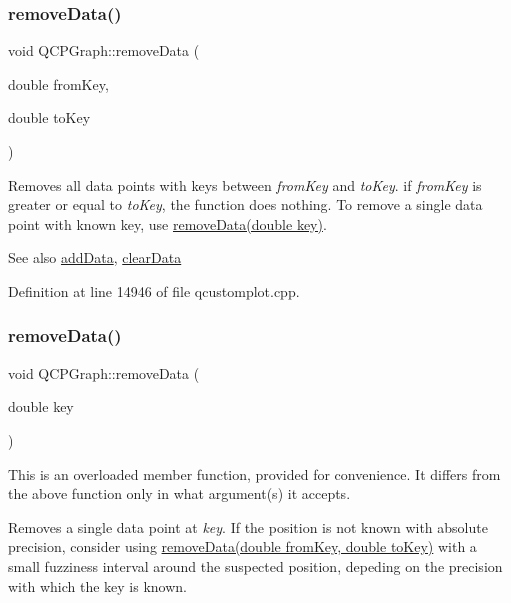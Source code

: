 \subsubsection{\texorpdfstring{remove\+Data()}{removeData()}\hspace{0.1cm}{\footnotesize\ttfamily [1/2]}}
{\footnotesize\ttfamily void Q\+C\+P\+Graph\+::remove\+Data (\begin{DoxyParamCaption}\item[{double}]{from\+Key,  }\item[{double}]{to\+Key }\end{DoxyParamCaption})}

Removes all data points with keys between {\itshape from\+Key} and {\itshape to\+Key}. if {\itshape from\+Key} is greater or equal to {\itshape to\+Key}, the function does nothing. To remove a single data point with known key, use \hyperlink{class_q_c_p_graph_a4a706020b4318f118381648ef18aca3f}{remove\+Data(double key)}.

\begin{DoxySeeAlso}{See also}
\hyperlink{class_q_c_p_graph_aa5c6181d84db72ce4dbe9dc15a34ef4f}{add\+Data}, \hyperlink{class_q_c_p_graph_ad4e94a4e44e5e76fbec81a72a977157d}{clear\+Data} 
\end{DoxySeeAlso}


Definition at line 14946 of file qcustomplot.\+cpp.

\mbox{\label{class_q_c_p_graph_a4a706020b4318f118381648ef18aca3f}} 
\subsubsection{\texorpdfstring{remove\+Data()}{removeData()}\hspace{0.1cm}{\footnotesize\ttfamily [2/2]}}
{\footnotesize\ttfamily void Q\+C\+P\+Graph\+::remove\+Data (\begin{DoxyParamCaption}\item[{double}]{key }\end{DoxyParamCaption})}

This is an overloaded member function, provided for convenience. It differs from the above function only in what argument(s) it accepts.

Removes a single data point at {\itshape key}. If the position is not known with absolute precision, consider using \hyperlink{class_q_c_p_graph_a4a0fde50b7db9db0a85b5c5b6b10098f}{remove\+Data(double from\+Key, double to\+Key)} with a small fuzziness interval around the suspected position, depeding on the precision with which the key is known.

